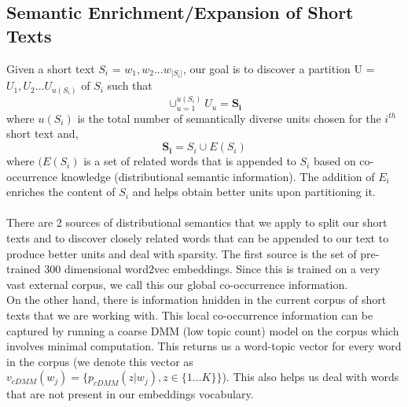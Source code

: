 \documentclass{sig-alternate-05-2015}
\begin{document}
\subsection{Semantic Enrichment/Expansion of Short Texts}
Given a short text $S_{i}$ = ${w_{1},w_{2} ... w_{|S_{i}|}}$, our goal is to discover a partition U = ${U_{1}, U_{2} ... U_{u(S_{i})}}$ of $S_{i}$ such that $$\cup_{u=1}^{u(S_{i})}U_{u} = \mathbf{S_{i}}$$ where $u(S_{i})$ is the total number of semantically diverse units chosen for the $i^{th}$  short text and, $$\mathbf{S_{i}} = S_{i} \cup E(S_{i})$$ where $(E(S_{i})$ is a set of related words that is appended to $S_{i}$ based on co-occurrence knowledge (distributional semantic information). The addition of $E_{i}$ enriches the content of $S_{i}$ and helps obtain better units upon partitioning it.
\\
\\
There are 2 sources of distributional semantics that we apply to split our short texts and to discover closely related words that can be appended to our text to produce better units and deal with sparsity. The first source is the set of pre-trained 300 dimensional word2vec embeddings. Since this is trained on a very vast external corpus, we call this our global co-occurrence information.\\ On the other hand, there is information hnidden in the current corpus of short texts that we are working with. This local co-occurrence information can be captured by running a coarse DMM (low topic count) model on the corpus which involves minimal computation. This returns us a word-topic vector for every word in the corpus (we denote this vector as $v_{cDMM}(w_{j}) = \{p_{cDMM}(z|w_{j}), z \in \{1 ... K\}\}$). This also helps us deal with words that are not present in our embeddings vocabulary.
\end{document}
